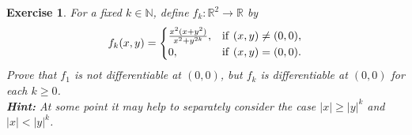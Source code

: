 \documentclass[11pt]{article}
\newtheorem{exercise}{Exercise}[section]
\theoremstyle{definition}
\numberwithin{equation}{subsection}
\begin{document}
\medskip

\begin{exercise}
For a fixed $k \in \mathbb{N}$, define $f_k: \mathbb{R}^2 \to \mathbb{R}$ by
\begin{align*}
    f_k(x,y) = \begin{cases}
        \frac{x^2(x + y^2)}{x^2 + y^{2k}}, & {\rm if}\,\, (x,y) \neq (0,0), \\
        0, & {\rm if}\,\, (x,y) = (0,0).
    \end{cases}
\end{align*}
Prove that $f_1$ is not differentiable at $(0,0)$, but $f_k$ is differentiable at $(0,0)$ for each $k \geq 0$.\\
{\bf Hint:} At some point it may help to separately consider the case $|x| \geq |y|^k$ and $|x| < |y|^k$.
\end{exercise}
\end{document}

